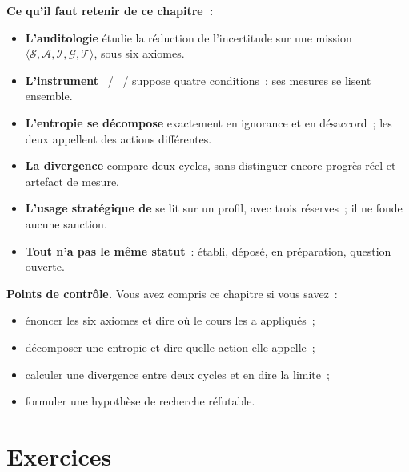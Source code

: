 \begin{boxresume}
\textbf{Ce qu'il faut retenir de ce chapitre~:}
\begin{itemize}
    \item \textbf{L'auditologie} étudie la réduction de l'incertitude sur une
          mission $\langle \mathcal{S}, \mathcal{A}, \mathcal{I},
          \mathcal{G}, \mathcal{T} \rangle$, sous six axiomes.
    \item \textbf{L'instrument} \OUI{}~/ \NON{}~/ \NEK{} suppose quatre
          conditions~; ses mesures se lisent ensemble.
    \item \textbf{L'entropie se décompose} exactement en ignorance et en
          désaccord~; les deux appellent des actions différentes.
    \item \textbf{La divergence} compare deux cycles, sans distinguer encore
          progrès réel et artefact de mesure.
    \item \textbf{L'usage stratégique de \NEK{}} se lit sur un profil, avec
          trois réserves~; il ne fonde aucune sanction.
    \item \textbf{Tout n'a pas le même statut}~: établi, déposé, en
          préparation, question ouverte.
\end{itemize}
\end{boxresume}

\begin{boxinfo}
\textbf{Points de contrôle.} Vous avez compris ce chapitre si vous savez~:
\begin{itemize}
    \item énoncer les six axiomes et dire où le cours les a appliqués~;
    \item décomposer une entropie et dire quelle action elle appelle~;
    \item calculer une divergence entre deux cycles et en dire la limite~;
    \item formuler une hypothèse de recherche réfutable.
\end{itemize}
\end{boxinfo}

\section*{Exercices}


